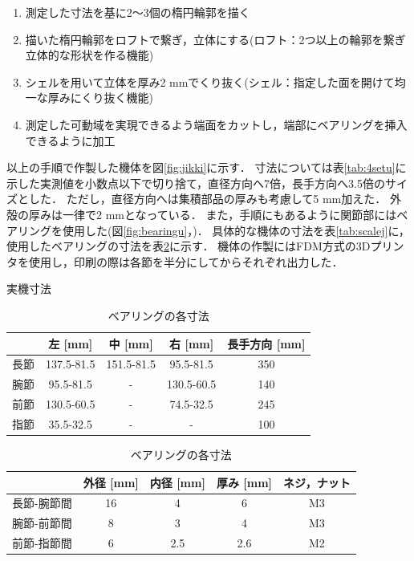 \begin{enumerate}
  \item 測定した寸法を基に2～3個の楕円輪郭を描く
  \item 描いた楕円輪郭をロフトで繋ぎ，立体にする(ロフト：2つ以上の輪郭を繋ぎ立体的な形状を作る機能)
  \item シェルを用いて立体を厚み2 mmでくり抜く(シェル：指定した面を開けて均一な厚みにくり抜く機能)
  \item 測定した可動域を実現できるよう端面をカットし，端部にベアリングを挿入できるように加工
\end{enumerate}
以上の手順で作製した機体を図\ref{fig:jikki}に示す．
寸法については表\ref{tab:4setu}に示した実測値を小数点以下で切り捨て，直径方向へ7倍，長手方向へ3.5倍のサイズとした．
ただし，直径方向へは集積部品の厚みも考慮して5 mm加えた．
外殻の厚みは一律で2 mmとなっている．
また，手順にもあるように関節部にはベアリングを使用した(図\ref{fig:bearingu}，)．
具体的な機体の寸法を表\ref{tab:scalej}に，使用したベアリングの寸法を表\ref{tab:bearingu}に示す．
機体の作製にはFDM方式の3Dプリンタを使用し，印刷の際は各節を半分にしてからそれぞれ出力した．
\begin{table}[t]
  \begin{minipage}{1\hsize}
    \centering
    \caption{実機寸法}
    \label{tab:scalej}
    \vspace{-3mm}
    \begin{tabular}{|c|c|c|c|c|}
    \hline
      & 左 [mm]         & 中 [mm]         & 右 [mm]         & 長手方向 [mm] \\ \hline
    長節 & 137.5-81.5 & 151.5-81.5 & 95.5-81.5  & 350  \\ \hline
    腕節 & 95.5-81.5  & -          & 130.5-60.5 & 140  \\ \hline
    前節 & 130.5-60.5 & -          & 74.5-32.5  & 245  \\ \hline
    指節 & 35.5-32.5  & -          & -          & 100  \\ \hline
    \end{tabular}
  \end{minipage}
  \begin{minipage}{1\hsize}
    \centering
    \vspace{3mm}
    \caption{ベアリングの各寸法}
    \vspace{-3mm}
    \label{tab:bearingu}
    \begin{tabular}{|c|c|c|c|c|}
    \hline
          & 外径 [mm] & 内径 [mm]  & 厚み [mm]  & ネジ，ナット \\ \hline
    長節-腕節間 & 16 & 4   & 6   & M3      \\ \hline
    腕節-前節間 & 8  & 3   & 4   & M3      \\ \hline
    前節-指節間 & 6  & 2.5 & 2.6 & M2      \\ \hline
    \end{tabular}
  \end{minipage}
\end{table}
